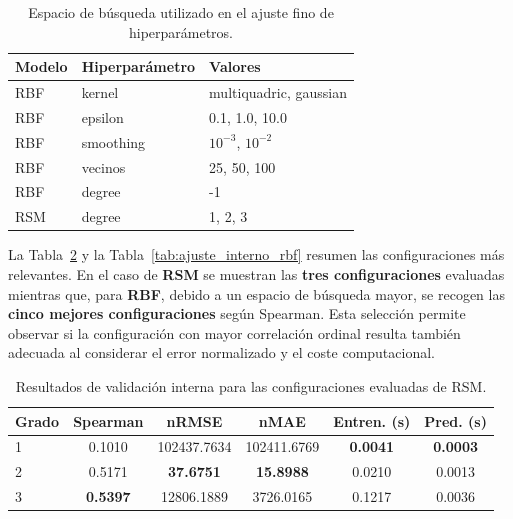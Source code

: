 \begin{table}[htbp]
    \centering
    \small
    \setlength{\tabcolsep}{4pt}
    \begin{tabular}{lll}
        \toprule
        \textbf{Modelo} & \textbf{Hiperparámetro} & \textbf{Valores}       \\
        \midrule
        RBF             & kernel                  & multiquadric, gaussian \\
        RBF             & epsilon                 & 0.1, 1.0, 10.0         \\
        RBF             & smoothing               & $10^{-3}$, $10^{-2}$   \\
        RBF             & vecinos                 & 25, 50, 100            \\
        RBF             & degree                  & -1                     \\
        RSM             & degree                  & 1, 2, 3                \\
        \bottomrule
    \end{tabular}
    \caption{Espacio de búsqueda utilizado en el ajuste fino de hiperparámetros.}
    \label{tab:grid_hiperparametros_rbf_rsm}
\end{table}


La Tabla~\ref{tab:ajuste_interno_rsm} y la Tabla~\ref{tab:ajuste_interno_rbf} resumen las configuraciones más relevantes. En el caso de \textbf{RSM} se muestran las \textbf{tres configuraciones} evaluadas mientras que, para \textbf{RBF}, debido a un espacio de búsqueda mayor, se recogen las \textbf{cinco mejores configuraciones} según Spearman. Esta selección permite observar si la configuración con mayor correlación ordinal resulta también adecuada al considerar el error normalizado y el coste computacional.

\begin{table}[H]
    \centering
    \small
    \begin{tabular}{l|ccccc}
        \toprule
        \textbf{Grado} & \textbf{Spearman} & \textbf{nRMSE}   & \textbf{nMAE}    & \textbf{Entren. (s)} & \textbf{Pred. (s)} \\
        \midrule
        1              & 0.1010            & 102437.7634      & 102411.6769      & \textbf{0.0041}      & \textbf{0.0003}    \\
        2              & 0.5171            & \textbf{37.6751} & \textbf{15.8988} & 0.0210               & 0.0013             \\
        3              & \textbf{0.5397}   & 12806.1889       & 3726.0165        & 0.1217               & 0.0036             \\
        \bottomrule
    \end{tabular}
    \caption{Resultados de validación interna para las configuraciones evaluadas de RSM.}
    \label{tab:ajuste_interno_rsm}
\end{table}

